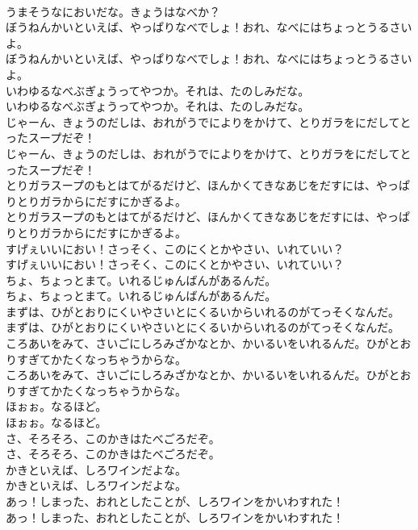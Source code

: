 \documentclass[8pt]{extreport}
\begin{document}
\begin{CJK}{UTF8}{min}
\\	うまそうなにおいだな。きょうはなべか？
\\	ぼうねんかいといえば、やっぱりなべでしょ！おれ、なべにはちょっとうるさいよ。
\\	ぼうねんかいといえば、やっぱりなべでしょ！おれ、なべにはちょっとうるさいよ。
\\	いわゆるなべぶぎょうってやつか。それは、たのしみだな。
\\	いわゆるなべぶぎょうってやつか。それは、たのしみだな。
\\	じゃーん、きょうのだしは、おれがうでによりをかけて、とりガラをにだしてとったスープだぞ！
\\	じゃーん、きょうのだしは、おれがうでによりをかけて、とりガラをにだしてとったスープだぞ！
\\	とりガラスープのもとはてがるだけど、ほんかくてきなあじをだすには、やっぱりとりガラからにだすにかぎるよ。
\\	とりガラスープのもとはてがるだけど、ほんかくてきなあじをだすには、やっぱりとりガラからにだすにかぎるよ。
\\	すげぇいいにおい！さっそく、このにくとかやさい、いれていい？
\\	すげぇいいにおい！さっそく、このにくとかやさい、いれていい？
\\	ちょ、ちょっとまて。いれるじゅんばんがあるんだ。
\\	ちょ、ちょっとまて。いれるじゅんばんがあるんだ。
\\	まずは、ひがとおりにくいやさいとにくるいからいれるのがてっそくなんだ。
\\	まずは、ひがとおりにくいやさいとにくるいからいれるのがてっそくなんだ。
\\	ころあいをみて、さいごにしろみざかなとか、かいるいをいれるんだ。ひがとおりすぎてかたくなっちゃうからな。
\\	ころあいをみて、さいごにしろみざかなとか、かいるいをいれるんだ。ひがとおりすぎてかたくなっちゃうからな。
\\	ほぉぉ。なるほど。
\\	ほぉぉ。なるほど。
\\	さ、そろそろ、このかきはたべごろだぞ。
\\	さ、そろそろ、このかきはたべごろだぞ。
\\	かきといえば、しろワインだよな。
\\	かきといえば、しろワインだよな。
\\	あっ！しまった、おれとしたことが、しろワインをかいわすれた！
\\	あっ！しまった、おれとしたことが、しろワインをかいわすれた！

\end{CJK}
\end{document}
